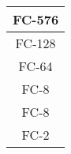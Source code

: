 \begin{table}[]
\begin{center}
\begin{tabular}{|c|c|c|c|}
			\multicolumn{4}{|c|}{FC-576}                                                                                                                                                                                                                                                                                                                                         \\ \hline
			\multicolumn{4}{|c|}{FC-128}                                                                                                                                                                                                                                                                                                                                         \\ \hline
			\multicolumn{4}{|c|}{FC-64}                                                                                                                                                                                                                                                                                                                                          \\ \hline
			\multicolumn{4}{|c|}{FC-8}                                                                                                                                                                                                                                                                                                                                           \\ \hline
			\multicolumn{4}{|c|}{FC-8}                                                                                                                                                                                                                                                                                                                                           \\ \hline
			\multicolumn{4}{|c|}{FC-2}                                                                                                                                                                                                                                                                                                                                          \\ \hline
		\end{tabular}
	\end{center}
\end{table}

